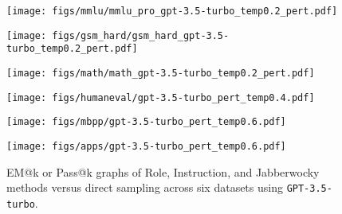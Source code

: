  \begin{figure*}[ht]
    \centering
    
    \begin{minipage}{0.32\textwidth}
        \texttt{[image: figs/mmlu/mmlu\_pro\_gpt-3.5-turbo\_temp0.2\_pert.pdf]}
        \label{fig:pert_turbo_mmlu}
    \end{minipage}
    \hfill
    \begin{minipage}{0.32\textwidth}
        \texttt{[image: figs/gsm\_hard/gsm\_hard\_gpt-3.5-turbo\_temp0.2\_pert.pdf]}
        \label{fig:pert_turbo_gsm_hard}
    \end{minipage}
    \hfill
    \begin{minipage}{0.32\textwidth}
        \texttt{[image: figs/math/math\_gpt-3.5-turbo\_temp0.2\_pert.pdf]}
       \label{fig:pert_turbo_math}
    \end{minipage}

    \begin{minipage}{0.32\textwidth}
        \texttt{[image: figs/humaneval/gpt-3.5-turbo\_pert\_temp0.4.pdf]}
        \label{fig:pert_turbo_humaneval}
    \end{minipage}
    \hfill
    \begin{minipage}{0.32\textwidth}
        \texttt{[image: figs/mbpp/gpt-3.5-turbo\_pert\_temp0.6.pdf]}
        \label{fig:pert_turbo_mbpp}
    \end{minipage}
    \hfill
    \begin{minipage}{0.32\textwidth}
        \texttt{[image: figs/apps/gpt-3.5-turbo\_pert\_temp0.6.pdf]}
        \label{fig:pert_turbo_apps}
    \end{minipage}
    \vspace{-0.5cm}
    \caption{EM@k or Pass@k graphs of Role, Instruction, and Jabberwocky methods versus direct sampling across six datasets using \texttt{GPT-3.5-turbo}.}
    \label{fig:pert_turbo}\vspace{-0.4cm}
\end{figure*}